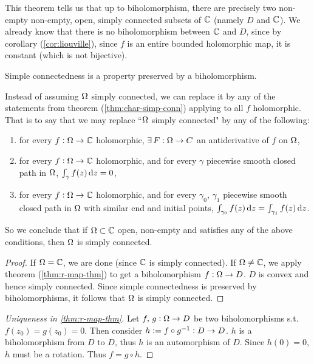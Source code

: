 \begin{remark}
This theorem tells us that up to biholomorphism, there are precisely two non-empty non-empty, open, simply connected subsets of $\mathbb{C}$ (namely $D$ and $\mathbb{C}$). We already know that there is no biholomorphism between $\mathbb{C}$ and $D$, since by corollary (\ref{cor:liouville}), since $f$ is an entire bounded holomorphic map, it is constant (which is not bijective).
\end{remark}

\begin{note}

Simple connectedness is a property preserved by a biholomorphism.

\end{note}

\begin{remark}
Instead of assuming $\Omega$ simply connected, we can replace it by any of the statements from theorem (\ref{thm:char-simp-conn}) applying to all $f$ holomorphic. That is to say that we may replace ``$\Omega$ simply connected" by any of the following:
\begin{enumerate}
    \item for every $f: \Omega \to \mathbb{C}$ holomorphic, $\exists \, F : \Omega \to C$ an antiderivative of $f$ on $\Omega$,
    \item for every $f: \Omega \to \mathbb{C}$ holomorphic, and for every $\gamma$ piecewise smooth closed path in $\Omega$, $\int_\gamma f(z) \dif z = 0$,
    \item for every $f: \Omega \to \mathbb{C}$ holomorphic, and for every $\gamma_0, \, \gamma_1$ piecewise smooth closed path in $\Omega$ with similar end and initial points, $\int_{\gamma_0} f(z) \dif z = \int_{\gamma_1} f(z) \dif z$.
\end{enumerate}

So we conclude that if $\Omega \subset \mathbb{C}$ open, non-empty and satisfies any of the above conditions, then $\Omega$ is simply connected.


\begin{proof}
If $\Omega = \mathbb{C}$, we are done (since $\mathbb{C}$ is simply connected). If $\Omega \neq \mathbb{C}$, we apply theorem (\ref{thm:r-map-thm}) to get a biholomorphism $f: \Omega \to D$. $D$ is convex and hence simply connected. Since simple connectedness is preserved by biholomorphisms, it follows that $\Omega$ is simply connected.
\end{proof}



\end{remark}

\begin{proof}[Uniqueness in \ref{thm:r-map-thm}]
Let $f, \, g : \Omega \to D$ be two biholomorphisms s.t. $f(z_0) = g(z_0) = 0$. Then consider $h \vcentcolon = f \circ g^{-1} : D \to D$. $h$ is a biholomorphism from $D$ to $D$, thus $h$ is an automorphism of $D$. Since $h(0) = 0$, $h$ must be a rotation. Thus $f = g \circ h$.
\end{proof}
